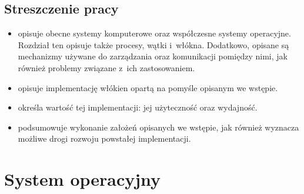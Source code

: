 \documentclass[12pt]{mwart}
\begin{document}
\subsection{Streszczenie pracy}
\indent
	\begin{itemize}
	\item[Rozdział \ref{sec:system}] opisuje obecne systemy komputerowe oraz współczesne systemy operacyjne. Rozdział ten opisuje także
    procesy, wątki i~włókna. Dodatkowo, opisane są mechanizmy używane do zarządzania oraz komunikacji pomiędzy nimi, jak również problemy
    związane z~ich zastosowaniem.
	\item[Rozdział \ref{sec:solution}] opisuje implementację włókien opartą na pomyśle opisanym we wstępie.
	\item[Rozdział \ref{sec:analysis}] określa wartość tej implementacji: jej użyteczność oraz wydajność.
	\item[Rozdział \ref{sec:summary}] podsumowuje wykonanie założeń opisanych we wstępie, jak również wyznacza możliwe drogi rozwoju
		powstałej implementacji.
	\end{itemize}
\par
%
\newpage
\section{System operacyjny}
%
\label{sec:system}
\end{document}
